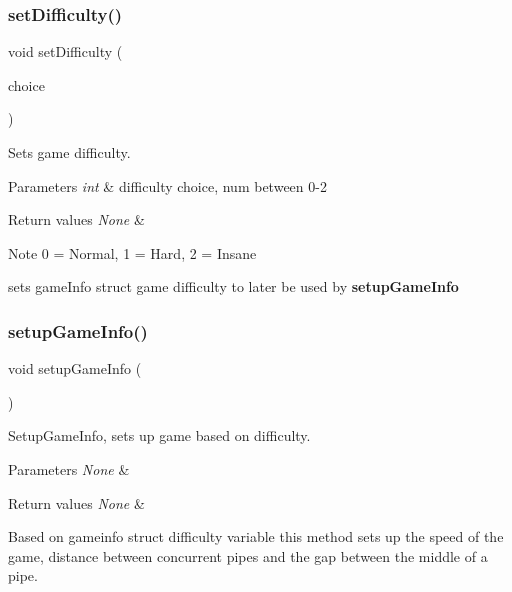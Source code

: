 \subsubsection{\texorpdfstring{set\+Difficulty()}{setDifficulty()}}
{\footnotesize\ttfamily void set\+Difficulty (\begin{DoxyParamCaption}\item[{int}]{choice }\end{DoxyParamCaption})}



Sets game difficulty. 


\begin{DoxyParams}{Parameters}
{\em int} & difficulty choice, num between 0-\/2 \\
\hline
\end{DoxyParams}

\begin{DoxyRetVals}{Return values}
{\em None} & \\
\hline
\end{DoxyRetVals}
\begin{DoxyNote}{Note}
0 = Normal, 1 = Hard, 2 = Insane
\end{DoxyNote}
sets game\+Info struct game difficulty to later be used by {\bfseries setup\+Game\+Info} \mbox{\label{group___flappy___bird_ga4b5a711a6b4b72b301a69dc3d5fd43ac}} 
\subsubsection{\texorpdfstring{setup\+Game\+Info()}{setupGameInfo()}}
{\footnotesize\ttfamily void setup\+Game\+Info (\begin{DoxyParamCaption}\item[{void}]{ }\end{DoxyParamCaption})}



Setup\+Game\+Info, sets up game based on difficulty. 


\begin{DoxyParams}{Parameters}
{\em None} & \\
\hline
\end{DoxyParams}

\begin{DoxyRetVals}{Return values}
{\em None} & \\
\hline
\end{DoxyRetVals}
Based on gameinfo struct difficulty variable this method sets up the speed of the game, distance between concurrent pipes and the gap between the middle of a pipe. \mbox{\label{group___flappy___bird_gaf7865b4fde856c70ea4ec05b0ebb1dfe}} 
